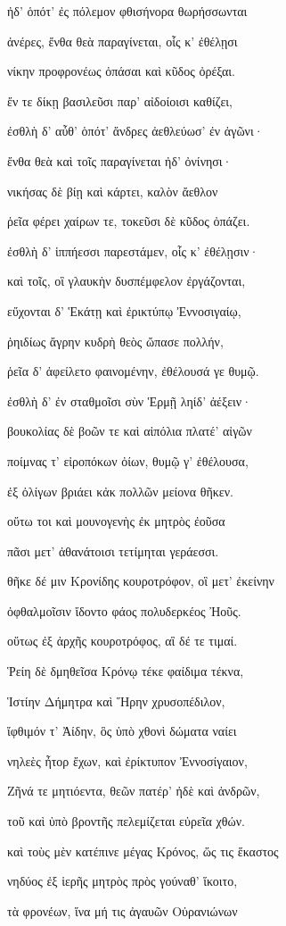 \begin{pages}
\begin{Leftside}
ἠδ' ὁπότ' ἐς πόλεμον φθισήνορα θωρήσσωνται

ἀνέρες, ἔνθα θεὰ παραγίνεται, οἷς κ' ἐθέλῃσι

νίκην προφρονέως ὀπάσαι καὶ κῦδος ὀρέξαι.

ἔν τε δίκῃ βασιλεῦσι παρ' αἰδοίοισι καθίζει,

ἐσθλὴ δ' αὖθ' ὁπότ' ἄνδρες ἀεθλεύωσ' ἐν ἀγῶνι· 

ἔνθα θεὰ καὶ τοῖς παραγίνεται ἠδ' ὀνίνησι· 

νικήσας δὲ βίῃ καὶ κάρτει, καλὸν ἄεθλον 

ῥεῖα φέρει χαίρων τε, τοκεῦσι δὲ κῦδος ὀπάζει.

ἐσθλὴ δ' ἱππήεσσι παρεστάμεν, οἷς κ' ἐθέλῃσιν·

καὶ τοῖς, οἳ γλαυκὴν δυσπέμφελον ἐργάζονται, 

εὔχονται δ' Ἑκάτῃ καὶ ἐρικτύπῳ Ἐννοσιγαίῳ,

ῥηιδίως ἄγρην κυδρὴ θεὸς ὤπασε πολλήν,

ῥεῖα δ' ἀφείλετο φαινομένην, ἐθέλουσά γε θυμῷ.

ἐσθλὴ δ' ἐν σταθμοῖσι σὺν Ἑρμῇ ληίδ' ἀέξειν· 

βουκολίας δὲ βοῶν τε καὶ αἰπόλια πλατέ' αἰγῶν 

ποίμνας τ' εἰροπόκων ὀίων, θυμῷ γ' ἐθέλουσα,

ἐξ ὀλίγων βριάει κἀκ πολλῶν μείονα θῆκεν.

οὕτω τοι καὶ μουνογενὴς ἐκ μητρὸς ἐοῦσα

πᾶσι μετ' ἀθανάτοισι τετίμηται γεράεσσι. 

θῆκε δέ μιν Κρονίδης κουροτρόφον, οἳ μετ' ἐκείνην

ὀφθαλμοῖσιν ἴδοντο φάος πολυδερκέος Ἠοῦς.

οὕτως ἐξ ἀρχῆς κουροτρόφος, αἳ δέ τε τιμαί.

Ῥείη δὲ δμηθεῖσα Κρόνῳ τέκε φαίδιμα τέκνα, 

Ἱστίην Δήμητρα καὶ Ἥρην χρυσοπέδιλον, 

ἴφθιμόν τ' Ἀίδην, ὃς ὑπὸ χθονὶ δώματα ναίει 

νηλεὲς ἦτορ ἔχων, καὶ ἐρίκτυπον Ἐννοσίγαιον,

Ζῆνά τε μητιόεντα, θεῶν πατέρ' ἠδὲ καὶ ἀνδρῶν,

τοῦ καὶ ὑπὸ βροντῆς πελεμίζεται εὐρεῖα χθών.

καὶ τοὺς μὲν κατέπινε μέγας Κρόνος, ὥς τις ἕκαστος

νηδύος ἐξ ἱερῆς μητρὸς πρὸς γούναθ' ἵκοιτο, 

τὰ φρονέων, ἵνα μή τις ἀγαυῶν Οὐρανιώνων


\end{Leftside}
\end{pages}
